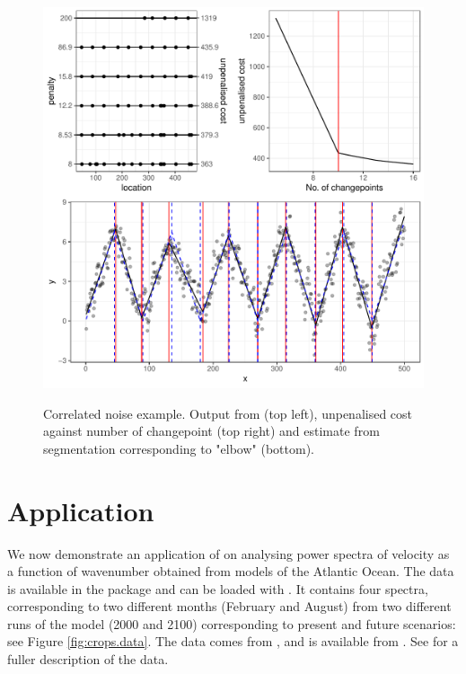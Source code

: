 \documentclass[nojss]{jss}
\begin{document}
\begin{figure}
\centering
{\includegraphics{figures/cpop_crops_ggplot.pdf}}
\caption{Correlated noise example. Output from  (top left), unpenalised cost against number of changepoint (top right) and estimate from segmentation corresponding to "elbow" (bottom).}
\label{fig:crops.cpopB}
\end{figure}


\section{Application} \label{sec:app}

We now demonstrate an application of  on analysing power spectra of velocity as a function of wavenumber obtained from models of the Atlantic Ocean. The data is available in the  package and can be loaded with . It contains four spectra, corresponding to two different months (February and August) from two different runs of the model (2000 and 2100) corresponding to present and future scenarios: see Figure \ref{fig:crops.data}. The data comes from \cite{richards2021impact}, and is available from \cite{richards2020data}. See \cite{richards2021impact} for a fuller description of the data.
\end{document}
